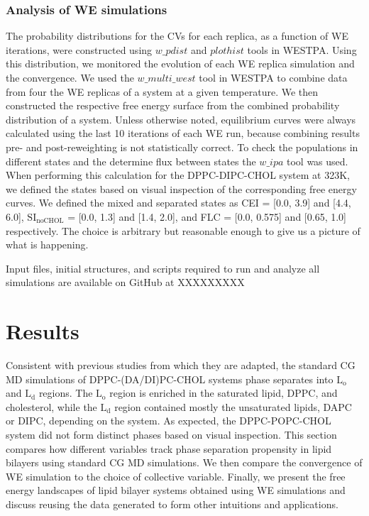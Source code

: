 \documentclass{biophys-new}
\begin{document}
\subsubsection*{Analysis of WE simulations}
The probability distributions for the CVs for each replica, as a function of WE iterations, were constructed using $w\_pdist$ and $plothist$ tools in WESTPA.
Using this distribution, we monitored the evolution of each WE replica simulation and the convergence.
We used the $w\_multi\_west$ tool in WESTPA to combine data from four the WE replicas of a system at a given temperature.
We then constructed the respective free energy surface from the combined probability distribution of a system. Unless otherwise noted, equilibrium curves were always calculated using the last 10 iterations of each WE run, because combining results pre- and post-reweighting is not statistically correct.
To check the populations in different states and the determine flux between states the $w\_ipa$ tool was used.
When performing this calculation for the DPPC-DIPC-CHOL system at 323K, we defined the states based on visual inspection of the corresponding free energy curves. We defined the mixed and separated states as CEI = [0.0, 3.9] and [4.4, 6.0], $\text{SI}_{\text{noCHOL}}$ = [0.0, 1.3] and [1.4, 2.0], and FLC = [0.0, 0.575] and [0.65, 1.0] respectively.
The choice is arbitrary but reasonable enough to give us a picture of what is happening. 

Input files, initial structures, and scripts required to run and analyze all simulations are available on GitHub at XXXXXXXXX

\section*{Results}

Consistent with previous studies from which they are adapted, the standard CG MD simulations of DPPC-(DA/DI)PC-CHOL systems phase separates into $\text{L}_{\text{o}}$ and $\text{L}_{\text{d}}$ regions.
The $\text{L}_{\text{o}}$ region is enriched in the saturated lipid, DPPC, and cholesterol, while the  
$\text{L}_{\text{d}}$ region contained mostly the unsaturated lipids, DAPC or DIPC, depending on the system.
As expected, the DPPC-POPC-CHOL system did not form distinct phases based on visual inspection.
This section compares how different variables track phase separation propensity in lipid bilayers using standard CG MD simulations.
We then compare the convergence of WE simulation to the choice of collective variable.
Finally, we present the free energy landscapes of lipid bilayer systems obtained using WE simulations and discuss reusing the data generated to form other intuitions and applications.
\end{document}
